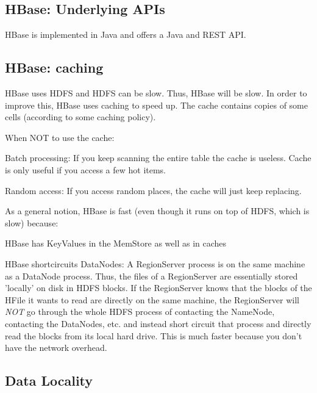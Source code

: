 \documentclass[11pt,oneside,a4paper]{article}
\begin{document}
\subsection{HBase: Underlying APIs}

HBase is implemented in Java and offers a Java and REST API.

\subsection{HBase: caching}

HBase uses HDFS and HDFS can be slow. Thus, HBase will be slow. In order to improve this, HBase uses caching to speed up. The cache contains copies of some cells (according to some caching policy).

When NOT to use the cache:

\begin{compactitem}
	\item Batch processing: If you keep scanning the entire table the cache is useless. Cache is only useful if you access a few hot items.
	\item Random access: If you access random places, the cache will just keep replacing.\\
\end{compactitem}

As a general notion, HBase is fast (even though it runs on top of HDFS, which is slow) because:

\begin{compactitem}
	\item HBase has KeyValues in the MemStore as well as in caches
	\item HBase shortcircuits DataNodes: A RegionServer process is on the same machine as a DataNode process. Thus, the files of a RegionServer are essentially stored 'locally' on disk in HDFS blocks. If the RegionServer knows that the blocks of the HFile it wants to read are directly on the same machine, the RegionServer will \textit{NOT} go through the whole HDFS process of contacting the NameNode, contacting the DataNodes, etc. and instead short circuit that process and directly read the blocks from its local hard drive. This is much faster because you don't have the network overhead.
\end{compactitem}

\subsection{Data Locality}
\end{document}
